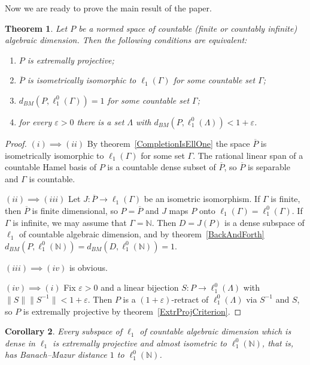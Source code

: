 \documentclass[12pt]{article}
\newtheorem{theorem}{Theorem}[section]
\newtheorem{corollary}[theorem]{Corollary}
\newcommand{\lo}[1]{\ell_1^0(#1)}
\newcommand{\ellone}[1]{\ell_1(#1)}
\newcommand{\norm}[1]{\lVert #1\rVert}
\newcommand{\BM}{d_{BM}}
\begin{document}
Now we are ready to prove the main result of the paper.

\begin{theorem}\label{MainTheorem} Let $P$ be a normed space of countable
    (finite or countably infinite) algebraic dimension. Then the following
    conditions are equivalent:
    \begin{enumerate}[label = (\roman*)]
        \item $P$ is extremally projective;
        \item $\overline{P}$ is isometrically isomorphic to $\ellone{\Gamma}$
              for some countable set $\Gamma$;
        \item $\BM(P,\lo{\Gamma})=1$ for some countable set $\Gamma$;
        \item for every $\varepsilon>0$ there is a set $\Lambda$ with
              $\BM(P,\lo{\Lambda})<1+\varepsilon$.
    \end{enumerate}
\end{theorem}
\begin{proof} $(i)\implies(ii)$ By theorem~\ref{CompletionIsEllOne} the space
    $\overline{P}$ is isometrically isomorphic to $\ellone{\Gamma}$ for some
    set $\Gamma$. The rational linear span of a countable Hamel basis of $P$
    is a countable dense subset of $\overline{P}$, so $\overline{P}$ is
    separable and $\Gamma$ is countable.

    $(ii)\implies(iii)$ Let $J:\overline{P}\to\ellone{\Gamma}$ be an isometric
    isomorphism. If $\Gamma$ is finite, then $\overline{P}$ is finite
    dimensional, so $P=\overline{P}$ and $J$ maps $P$ onto
    $\ellone{\Gamma}=\lo{\Gamma}$. If $\Gamma$ is infinite, we may assume that
    $\Gamma=\mathbb{N}$. Then $D=J(P)$ is a dense subspace of $\ell_1$ of
    countable algebraic dimension, and by theorem~\ref{BackAndForth}
    $\BM(P,\lo{\mathbb{N}})=\BM(D,\lo{\mathbb{N}})=1$.

    $(iii)\implies(iv)$ is obvious.

    $(iv)\implies(i)$ Fix $\varepsilon>0$ and a linear bijection
    $S:P\to\lo{\Lambda}$ with $\norm{S}\norm{S^{-1}}<1+\varepsilon$. Then $P$
    is a $(1+\varepsilon)$-retract of $\lo{\Lambda}$ via $S^{-1}$ and $S$, so
    $P$ is extremally projective by theorem~\ref{ExtrProjCriterion}.
\end{proof}

\begin{corollary}\label{DenseCountableSubspaces} Every subspace of $\ell_1$
    of countable algebraic dimension which is dense in $\ell_1$ is extremally
    projective and almost isometric to $\lo{\mathbb{N}}$, that is, has
    Banach--Mazur distance $1$ to $\lo{\mathbb{N}}$.
\end{corollary}
\end{document}
